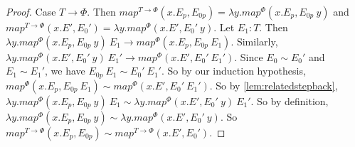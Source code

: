 \begin{proof}
  Case $T \to \Phi$.
  Then $map^{T \to \Phi}(x. E_p, E_{0p}) = \lambda y.map^\Phi(x.E_p, E_{0p}\ y)$ and $map^{T \to \Phi}(x. E', E_0') = \lambda y.map^\Phi(x.E', E_0'\ y)$.
  Let $E_1 : T$.
  Then $\lambda y.map^\Phi(x.E_p, E_{0p}\ y)\ E_1 \to map^\Phi(x.E_p, E_{0p}\ E_1)$.
  Similarly, $\lambda y.map^\Phi(x.E', E_0'\ y)\ E_1' \to map^\Phi(x. E', E_0'\ E_1')$.
  Since $E_0 \sim E_0'$ and $E_1 \sim E_1'$, we have $E_{0p}\ E_1 \sim E_0'\ E_1'$.
  So by our induction hypothesis, $map^\Phi(x.E_p, E_{0p}\ E_1) \sim map^\Phi(x. E', E_0'\ E_1')$.
  So by \ref{lem:relatedstepback}, $\lambda y.map^\Phi(x.E_p, E_{0p}\ y)\ E_1 \sim \lambda y.map^\Phi(x.E', E_0'\ y)\ E_1'$.
  So by definition, $\lambda y.map^\Phi(x.E_p, E_{0p}\ y) \sim \lambda y.map^\Phi(x.E', E_0'\ y)$.
  So $map^{T \to \Phi}(x. E_p, E_{0p}) \sim map^{T \to \Phi}(x. E', E_0')$.
\end{proof}

